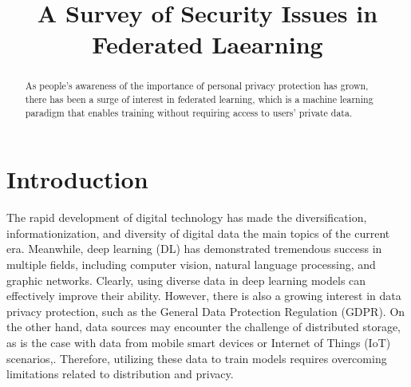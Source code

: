 \documentclass[conference]{IEEEtran}
\begin{document}
\title{A Survey of Security Issues in Federated Laearning}

\author{
    \and

}

\maketitle

\begin{abstract}
    As people's awareness of the importance of personal privacy protection has grown,
    there has been a surge of interest in federated learning,
    which is a machine learning paradigm that enables training without requiring
    access to users' private data.
\end{abstract}



\section{Introduction}
The rapid development of digital technology has made the diversification, informationization,
and diversity of digital data the main topics of the current era. Meanwhile, deep learning (DL) has
demonstrated tremendous success in multiple fields, including computer vision, natural language
processing, and graphic networks. Clearly, using diverse data in deep learning models can effectively
improve their ability. However, there is also a growing interest in data privacy protection,
such as the General Data Protection Regulation (GDPR)\cite{b1}. On the other hand, data sources may
encounter the challenge of distributed storage, as is the case with data from mobile smart devices
or Internet of Things (IoT) scenarios\cite{b2},\cite{b3}. Therefore, utilizing these data to train models requires
overcoming limitations related to distribution and privacy\cite{b4}.
\end{document}
